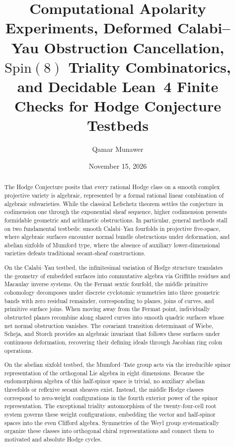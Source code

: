\documentclass[11pt,a4paper]{amsart}
\title[Deformed CY4 Apolarity, Spin(8) Combinatorics, and Lean 4 Checks]{%
  Computational Apolarity Experiments, Deformed Calabi--Yau Obstruction Cancellation,
  $\mathrm{Spin}(8)$ Triality Combinatorics, and Decidable Lean~4 Finite Checks
  for Hodge Conjecture Testbeds}
\author{Qamar Munawer}
\date{November 15, 2026}
\theoremstyle{definition}
\theoremstyle{remark}
\begin{document}
\begin{abstract}
The Hodge Conjecture posits that every rational Hodge class on a smooth complex projective variety is algebraic, represented by a formal rational linear combination of algebraic subvarieties. While the classical Lefschetz theorem settles the conjecture in codimension one through the exponential sheaf sequence, higher codimension presents formidable geometric and arithmetic obstructions. In particular, general methods stall on two fundamental testbeds: smooth Calabi--Yau fourfolds in projective five-space, where algebraic surfaces encounter normal bundle obstructions under deformation, and abelian sixfolds of Mumford type, where the absence of auxiliary lower-dimensional varieties defeats traditional secant-sheaf constructions.

On the Calabi--Yau testbed, the infinitesimal variation of Hodge structure translates the geometry of embedded surfaces into commutative algebra via Griffiths residues and Macaulay inverse systems. On the Fermat sextic fourfold, the middle primitive cohomology decomposes under discrete cyclotomic symmetries into three geometric bands with zero residual remainder, corresponding to planes, joins of curves, and primitive surface joins. When moving away from the Fermat point, individually obstructed planes recombine along shared curves into smooth quadric surfaces whose net normal obstruction vanishes. The covariant transition determinant of Wiebe, Scheja, and Storch provides an algebraic invariant that follows these surfaces under continuous deformation, recovering their defining ideals through Jacobian ring colon operations.

On the abelian sixfold testbed, the Mumford--Tate group acts via the irreducible spinor representation of the orthogonal Lie algebra in eight dimensions. Because the endomorphism algebra of this half-spinor space is trivial, no auxiliary abelian threefolds or reflexive secant sheaves exist. Instead, the middle Hodge classes correspond to zero-weight configurations in the fourth exterior power of the spinor representation. The exceptional triality automorphism of the twenty-four-cell root system governs these weight configurations, embedding the vector and half-spinor spaces into the even Clifford algebra. Symmetries of the Weyl group systematically organize these classes into orthogonal chiral representations and connect them to motivated and absolute Hodge cycles.


\end{abstract}
\end{document}
